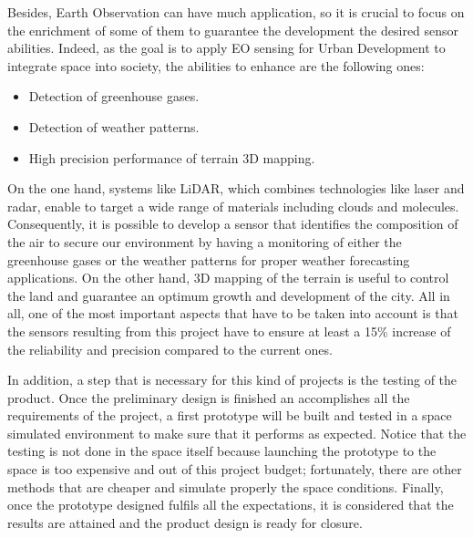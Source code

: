 Besides, Earth Observation can have much application, so it is crucial to focus on the enrichment of some of them to guarantee the development the desired sensor abilities. Indeed, as the goal is to apply EO sensing for Urban Development to integrate space into society, the abilities to enhance are the following ones:
\begin{itemize}
	\item Detection of greenhouse gases. 
	\item Detection of weather patterns.
	\item High precision performance of terrain 3D mapping. 
\end{itemize} 
On the one hand, systems like LiDAR, which combines technologies like laser and radar, enable to target a wide range of materials including clouds and molecules. Consequently, it is possible to develop a sensor that identifies the composition of the air to secure our environment by having a monitoring of either the greenhouse gases or the weather patterns for proper weather forecasting applications. On the other hand, 3D mapping of the terrain is useful to control the land and guarantee an optimum growth and development of the city. All in all, one of the most important aspects that have to be taken into account is that the sensors resulting from this project have to ensure at least a 15\% increase of the reliability and precision compared to the current ones.  

In addition, a step that is necessary for this kind of projects is the testing of the product. Once the preliminary design is finished an accomplishes all the requirements of the project, a first prototype will be built and tested in a space simulated environment to make sure that it performs as expected. Notice that the testing is not done in the space itself because launching the prototype to the space is too expensive and out of this project budget; fortunately, there are other methods that are cheaper and simulate properly the space conditions. Finally, once the prototype designed fulfils all the expectations, it is considered that the results are attained and the product design is ready for closure. 